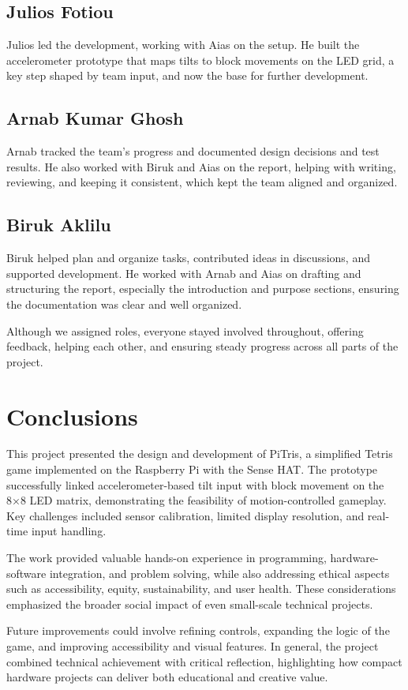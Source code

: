 \documentclass[11pt,titlepage,openright]{book}
\begin{document}
\section{Julios Fotiou}
Julios led the development, working with Aias on the setup. He built the accelerometer prototype that maps tilts to block movements on the LED grid, a key step shaped by team input, and now the base for further development.

\section{Arnab Kumar Ghosh}
Arnab tracked the team’s progress and documented design decisions and test results. He also worked with Biruk and Aias on the report, helping with writing, reviewing, and keeping it consistent, which kept the team aligned and organized. 


\section{Biruk Aklilu}
Biruk helped plan and organize tasks, contributed ideas in discussions, and supported development. He worked with Arnab and Aias on drafting and structuring the report, especially the introduction and purpose sections, ensuring the documentation was clear and well organized.

 \vspace{3ex}Although we assigned roles, everyone stayed involved throughout, offering feedback, helping each other, and ensuring steady progress across all parts of the project. 


\chapter{Conclusions}
This project presented the design and development of PiTris, a simplified Tetris game implemented on the Raspberry Pi with the Sense HAT. The prototype successfully linked accelerometer-based tilt input with block movement on the 8×8 LED matrix, demonstrating the feasibility of motion-controlled gameplay. Key challenges included sensor calibration, limited display resolution, and real-time input handling.

The work provided valuable hands-on experience in programming, hardware-software integration, and problem solving, while also addressing ethical aspects such as accessibility, equity, sustainability, and user health. These considerations emphasized the broader social impact of even small-scale technical projects.

Future improvements could involve refining controls, expanding the logic of the game, and improving accessibility and visual features. In general, the project combined technical achievement with critical reflection, highlighting how compact hardware projects can deliver both educational and creative value.




\end{document}

